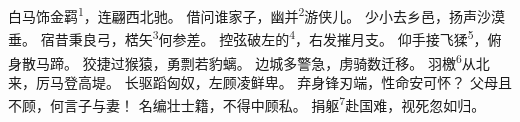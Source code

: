 
\begin{poem}
白马饰金羁\textsuperscript{1}，连翩西北驰。
借问谁家子，幽并\textsuperscript{2}游侠儿。
少小去乡邑，扬声沙漠垂。
宿昔秉良弓，楛矢\textsuperscript{3}何参差。
控弦破左的\textsuperscript{4}，右发摧月支。
仰手接飞猱\textsuperscript{5}，俯身散马蹄。
狡捷过猴猿，勇剽若豹螭。
边城多警急，虏骑数迁移。
羽檄\textsuperscript{6}从北来，厉马登高堤。
长驱蹈匈奴，左顾凌鲜卑。
弃身锋刃端，性命安可怀？
父母且不顾，何言子与妻！
名编壮士籍，不得中顾私。
捐躯\textsuperscript{7}赴国难，视死忽如归。
\end{poem}

\begin{annotations}
\end{annotations}


